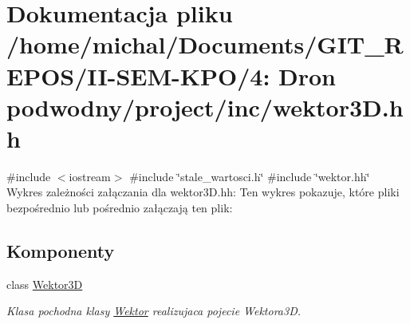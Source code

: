 \hypertarget{wektor3_d_8hh}{}\section{Dokumentacja pliku /home/michal/\+Documents/\+G\+I\+T\+\_\+\+R\+E\+P\+O\+S/\+I\+I-\/\+S\+E\+M-\/\+K\+P\+O/4\+: Dron podwodny/project/inc/wektor3D.hh}
\label{wektor3_d_8hh}
{\ttfamily \#include $<$iostream$>$}\newline
{\ttfamily \#include \char`\"{}stale\+\_\+wartosci.\+h\char`\"{}}\newline
{\ttfamily \#include \char`\"{}wektor.\+hh\char`\"{}}\newline
Wykres zależności załączania dla wektor3\+D.\+hh\+:
Ten wykres pokazuje, które pliki bezpośrednio lub pośrednio załączają ten plik\+:
\subsection*{Komponenty}
\begin{DoxyCompactItemize}
\item 
class \hyperlink{class_wektor3_d}{Wektor3D}
\begin{DoxyCompactList}\small\item\em Klasa pochodna klasy \hyperlink{class_wektor}{Wektor} realizujaca pojecie Wektora3D. \end{DoxyCompactList}\end{DoxyCompactItemize}
